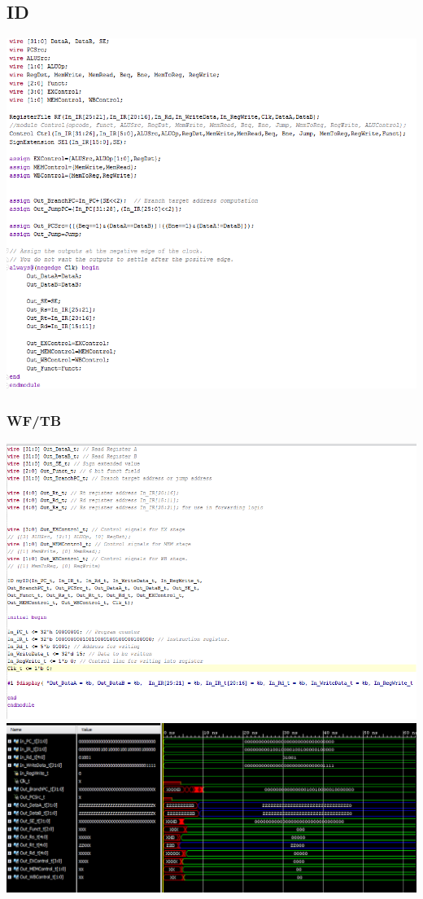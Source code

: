 \documentclass{llncs}
\begin{document}
\begin{addmargin}[-5em]{-2em}
\subsection{ID}
\label{id:1}
\begin{flushleft}
  \includegraphics[scale=.6]{../Screenshots/ID.PNG}
\end{flushleft}
\subsubsection{WF/TB}
\begin{flushleft}
\includegraphics[scale=.6]{../Screenshots/ID_tb.PNG}
\includegraphics[scale=.6]{../Screenshots/ID_Waveform.PNG}
\end{flushleft}


\end{addmargin}
\end{document}
